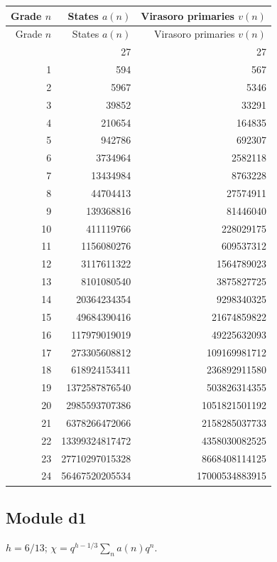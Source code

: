 \begingroup\small
\setlength{\tabcolsep}{5pt}
\begin{longtable}{@{}rrr@{}}
\toprule
Grade $n$ & States $a(n)$ & Virasoro primaries $v(n)$\\
\midrule\endfirsthead
\toprule
Grade $n$ & States $a(n)$ & Virasoro primaries $v(n)$\\
\midrule\endhead
\bottomrule\endfoot
0 & 27 & 27\\
1 & 594 & 567\\
2 & 5967 & 5346\\
3 & 39852 & 33291\\
4 & 210654 & 164835\\
5 & 942786 & 692307\\
6 & 3734964 & 2582118\\
7 & 13434984 & 8763228\\
8 & 44704413 & 27574911\\
9 & 139368816 & 81446040\\
10 & 411119766 & 228029175\\
11 & 1156080276 & 609537312\\
12 & 3117611322 & 1564789023\\
13 & 8101080540 & 3875827725\\
14 & 20364234354 & 9298340325\\
15 & 49684390416 & 21674859822\\
16 & 117979019019 & 49225632093\\
17 & 273305608812 & 109169981712\\
18 & 618924153411 & 236892911580\\
19 & 1372587876540 & 503826314355\\
20 & 2985593707386 & 1051821501192\\
21 & 6378266472066 & 2158285037733\\
22 & 13399324817472 & 4358030082525\\
23 & 27710297015328 & 8668408114125\\
24 & 56467520205534 & 17000534883915\\
\end{longtable}
\endgroup

\subsection{Module d1}
$h=6/13$; $\chi=q^{h-1/3}\sum_n a(n)q^n$.

